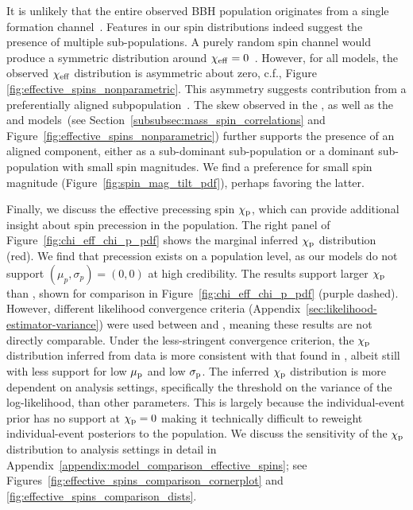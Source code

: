 It is unlikely that the entire observed \ac{BBH} population originates from a single formation channel~\citep{Zevin:2020gbd,Mandel:2021smh,Cheng:2023ddt,Afroz:2024fzp,Colloms:2025hib}.
Features in our spin distributions indeed suggest the presence of multiple sub-populations.
A purely random spin channel would produce a symmetric distribution around $\chi_{\rm eff}=0$~\citep{Rodriguez:2016kxx,Rodriguez:2016vmx,Farr:2017uvj}.
However, for all models, the observed $\chi_{\rm eff}$ distribution is asymmetric about zero, c.f., Figure \ref{fig:effective_spins_nonparametric}.
This asymmetry suggests contribution from a preferentially aligned subpopulation~\citep{Gerosa:2018wbw,Sedda:2023mlv,Banagiri:2025dxo}.
The skew observed in the \skewnormalChiEff, as well as the \qchiefflinearcorrelation and \qchieffsplinecorrelation models~(see Section~\ref{subsubsec:mass_spin_correlations} and Figure~\ref{fig:effective_spins_nonparametric}) further supports the presence of an aligned component, either as a sub-dominant sub-population or a dominant sub-population with small spin magnitudes. 
We find a preference for small spin magnitude (Figure~\ref{fig:spin_mag_tilt_pdf}), perhaps favoring the latter.

Finally, we discuss the effective precessing spin $\chi_\mathrm{p}$, which can provide additional insight about spin precession in the population.
The right panel of Figure~\ref{fig:chi_eff_chi_p_pdf} shows the marginal inferred $\chi_\mathrm{p}$ distribution (red).
We find that precession exists on a population level, as our models do not support $(\mu_p, \sigma_p) = (0,0)$ at high credibility.
The \gwtcfour results support larger $\chi_\mathrm{p}$ than \gwtcthree, shown for comparison in Figure~\ref{fig:chi_eff_chi_p_pdf} (purple dashed).
However, different likelihood convergence criteria (Appendix~\ref{sec:likelihood-estimator-variance}) were used between \gwtcfour and \gwtcthree, meaning these results are not directly comparable. 
Under the less-stringent \gwtcthree convergence criterion, the $\chi_\mathrm{p}$ distribution inferred from \gwtcfour data is more consistent with that found in \gwtcthree, albeit still with less support for low $\mu_{\rm p}$ and low $\sigma_{\rm p}$. 
The inferred $\chi_\mathrm{p}$ distribution is more dependent on analysis settings, specifically the threshold on the variance of the log-likelihood, than other parameters. This is largely because the individual-event prior has no support at $\chi_\mathrm{p}=0$ making it technically difficult to reweight individual-event posteriors to the population.
We discuss the sensitivity of the $\chi_\mathrm{p}$ distribution to analysis settings in detail in Appendix~\ref{appendix:model_comparison_effective_spins}; see Figures~\ref{fig:effective_spins_comparison_cornerplot} and \ref{fig:effective_spins_comparison_dists}.